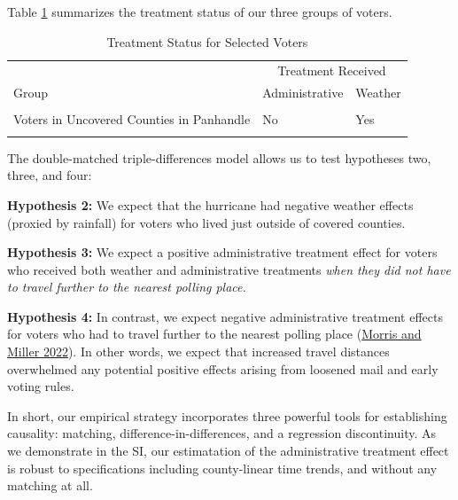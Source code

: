 \documentclass[
  12pt,
]{article}
\begin{document}
Table \ref{tab:groups} summarizes the treatment status of our three groups of voters.

\begin{singlespace}
\begin{table}[H]

\caption{\label{tab:groups-treat}\label{tab:groups} Treatment Status for Selected Voters}
\centering
\begin{tabular}[t]{lll}
\toprule
\multicolumn{1}{c}{ } & \multicolumn{2}{c}{Treatment Received} \\
\cmidrule(l{3pt}r{3pt}){2-3}
Group & Administrative & Weather\\
\midrule
\cellcolor{gray!6}{Voters in Covered Counties} & \cellcolor{gray!6}{Yes} & \cellcolor{gray!6}{Yes}\\
Voters in Uncovered Counties in Panhandle & No & Yes\\
\cellcolor{gray!6}{Voters Elsewhere} & \cellcolor{gray!6}{No} & \cellcolor{gray!6}{No}\\
\bottomrule
\end{tabular}
\end{table}
\end{singlespace}

The double-matched triple-differences model allows us to test hypotheses two, three, and four:

\textbf{Hypothesis 2:} We expect that the hurricane had negative weather effects (proxied by rainfall) for voters who lived just outside of covered counties.

\textbf{Hypothesis 3:} We expect a positive administrative treatment effect for voters who received both weather and administrative treatments \emph{when they did not have to travel further to the nearest polling place.}

\textbf{Hypothesis 4:} In contrast, we expect negative administrative treatment effects for voters who had to travel further to the nearest polling place (\protect\hyperlink{ref-Morris2022}{Morris and Miller 2022}). In other words, we expect that increased travel distances overwhelmed any potential positive effects arising from loosened mail and early voting rules.

In short, our empirical strategy incorporates three powerful tools for establishing causality: matching, difference-in-differences, and a regression discontinuity. As we demonstrate in the SI, our estimatation of the administrative treatment effect is robust to specifications including county-linear time trends, and without any matching at all.
\end{document}
